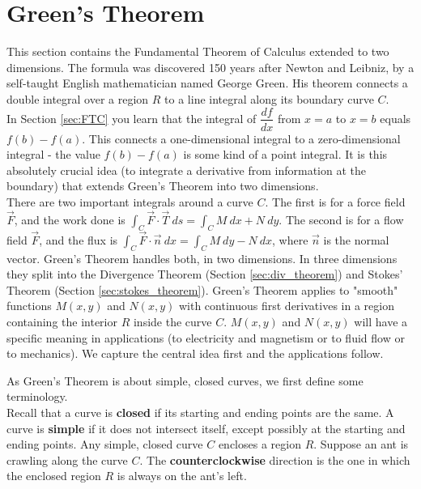 \section{Green's Theorem}\label{sec:greens_theorem}

This section contains the Fundamental Theorem of Calculus extended to two dimensions. The formula was discovered 150 years after Newton and Leibniz, by a self-taught English mathematician named George Green. His theorem connects a double integral over a region $R$ to a line integral along its boundary curve $C$.\\

In Section \ref{sec:FTC} you learn that the integral of $\dfrac{df}{dx}$ from $x=a$ to $x=b$ equals $f(b) - f (a)$. This connects a one-dimensional integral to a zero-dimensional integral - the value $f(b) - f(a)$ is some kind of a point integral. It is this absolutely crucial idea (to integrate a derivative from information at the boundary) that extends Green's Theorem into two dimensions.\\

There are two important integrals around a curve $C$. The first is for a force field $\vec F$, and the work done is $\displaystyle\int_C \vec F \cdot \vec T \: ds = \displaystyle\int_C M \: dx + N \: dy.$  The second is for a flow field $\vec F$, and the flux is $\displaystyle\int_C \vec F \cdot \vec n \: dx = \displaystyle\int_C M \: dy - N \: dx$, where $\vec n$ is the normal vector. Green's Theorem handles both, in two dimensions. In three dimensions they split into the Divergence Theorem (Section \ref{sec:div_theorem}) and Stokes' Theorem (Section \ref{sec:stokes_theorem}). Green's Theorem applies to "smooth" functions $M(x, y)$ and $N(x, y)$ with continuous first derivatives in a region containing the interior $R$ inside the curve $C$. $M(x,y)$ and $N(x,y)$ will have a specific meaning in applications (to electricity and magnetism or to fluid flow or to mechanics). We capture the central idea first and the applications follow.

As Green's Theorem is about simple, closed curves, we first define some terminology.\\

{Recall that a curve is \textbf{closed} if its starting and ending points are the same.  A curve is \textbf{simple} if it does not intersect itself, except possibly at the starting and ending points.  Any simple, closed curve $C$ encloses a region $R$.  Suppose an ant is crawling along the curve $C$.  The \textbf{counterclockwise} direction is the one in which the enclosed region $R$ is always on the ant's left.
}\\

